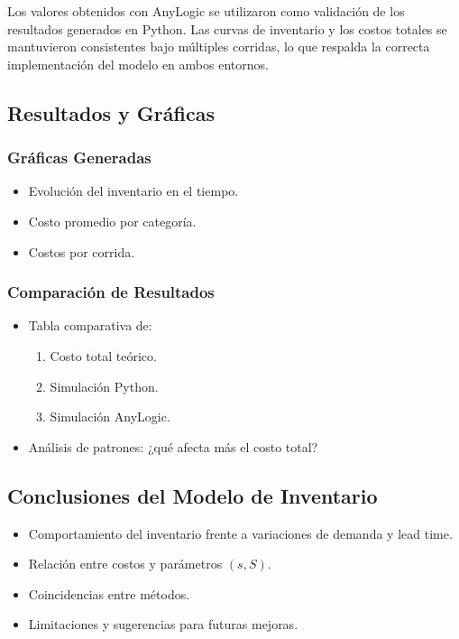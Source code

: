\documentclass[12pt]{article}
\begin{document}
Los valores obtenidos con AnyLogic se utilizaron como validación de los resultados generados en Python. Las curvas de inventario y los costos totales se mantuvieron consistentes bajo múltiples corridas, lo que respalda la correcta implementación del modelo en ambos entornos.



\subsection{Resultados y Gráficas}
\subsubsection*{Gráficas Generadas}
\begin{itemize}
    \item Evolución del inventario en el tiempo.
    \item Costo promedio por categoría.
    \item Costos por corrida.
\end{itemize}

\subsubsection*{Comparación de Resultados}
\begin{itemize}
    \item Tabla comparativa de:
    \begin{enumerate}
        \item Costo total teórico.
        \item Simulación Python.
        \item Simulación AnyLogic.
    \end{enumerate}
    \item Análisis de patrones: ¿qué afecta más el costo total?
\end{itemize}

\subsection{Conclusiones del Modelo de Inventario}
\begin{itemize}
    \item Comportamiento del inventario frente a variaciones de demanda y lead time.
    \item Relación entre costos y parámetros $(s, S)$.
    \item Coincidencias entre métodos.
    \item Limitaciones y sugerencias para futuras mejoras.
\end{itemize}
\end{document}
